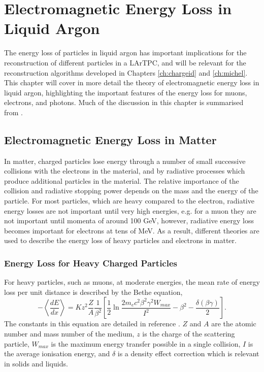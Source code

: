 \chapter{\label{ch:energyloss}Electromagnetic Energy Loss in Liquid Argon} 

\minitoc

\noindent
The energy loss of particles in liquid argon has important implications for the
reconstruction of different particles in a LArTPC, and will be relevant for the
reconstruction algorithms developed in Chapters \ref{ch:chargeid} and 
\ref{ch:michel}. This chapter will cover in more detail the theory of 
electromagnetic energy loss in liquid argon, highlighting the important 
features of the energy loss for muons, electrons, and photons. Much of the
discussion in this chapter is summarised from \cite{PhysRevD.98.030001}.

\section{Electromagnetic Energy Loss in Matter}
In matter, charged particles lose energy through a number of small successive
collisions with the electrons in the material, and by radiative processes which
produce additional particles in the material. The relative importance of the
collision and radiative stopping power depends on the mass and the energy of the
particle. For most particles, which are heavy compared to the electron, 
radiative energy losses are not important until very high energies, e.g. for a 
muon they are not important until momenta of around 100 GeV, however, radiative 
energy loss becomes important for electrons at tens of 
MeV\cite{PhysRevD.98.030001}. As a result, different theories are used to 
describe the energy loss of heavy particles and electrons in matter.

\subsection{Energy Loss for Heavy Charged Particles}
For heavy particles, such as muons, at moderate energies, the mean rate of 
energy loss per unit distance is described by the Bethe equation,
\begin{equation}
	- \left< \frac{dE}{dx}\right> = K z^2 \frac{Z}{A} \frac{1}{\beta^2} 
	\left[ \frac{1}{2} \ln \frac{2 m_e c^2 \beta^2 \gamma^2 W_{max}}{I^2} -
	\beta^2 - \frac{\delta(\beta \gamma)}{2}\right].
	\label{eq:mu_stop}
\end{equation}
The constants in this equation are detailed in reference
\cite{PhysRevD.98.030001}. $Z$ and $A$ are the atomic number and mass number of
the medium, $z$ is the charge of the scattering particle, $W_{max}$ is the 
maximum energy transfer possible in a single collision, $I$ is the average 
ionisation energy, and $\delta$ is a density effect correction which is 
relevant in solids and liquids. 

